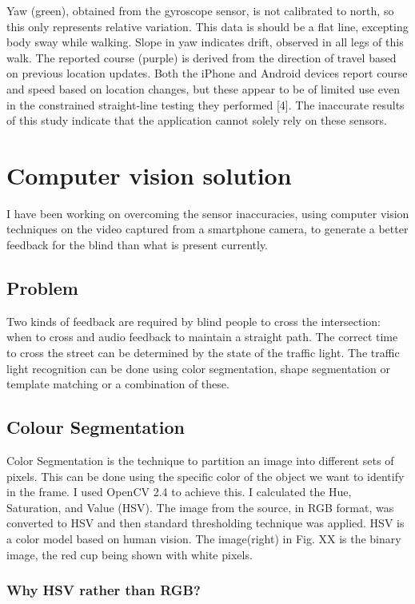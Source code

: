 Yaw (green), obtained from the gyroscope sensor, is not calibrated to north, so this only represents relative variation. This data is should be a flat line, excepting body sway while walking. Slope in yaw indicates drift, observed in all legs of this walk. The reported course (purple) is derived from the direction of travel based on previous location updates. Both the iPhone and Android devices report course and speed based on location changes, but these appear to be of limited use even in the constrained straight-line testing they performed [4]. The inaccurate results of this study indicate that the application cannot solely rely on these sensors.

\section{Computer vision solution}
I have been working on overcoming the sensor inaccuracies, using computer vision techniques on the video captured from a smartphone camera, to generate a better feedback for the blind than what is present currently.

\subsection{Problem}
Two kinds of feedback are required by blind people to cross the intersection: when to cross and audio feedback to maintain a straight path. The correct time to cross the street can be determined by the state of the traffic light. The traffic light recognition can be done using color segmentation, shape segmentation or template matching or a combination of these. 

\subsection{Colour Segmentation}

Color Segmentation is the technique to partition an image into different sets of pixels. This can be done using the specific color of the object we want to identify in the frame. I used OpenCV 2.4 to achieve this. I calculated the Hue, Saturation, and Value (HSV). The image from the source, in RGB format, was converted to HSV and then standard thresholding technique was applied. HSV is a color model based on human vision. The image(right) in Fig. XX is the binary image, the red cup being shown with white pixels.
 
\subsubsection{Why HSV rather than RGB?}


